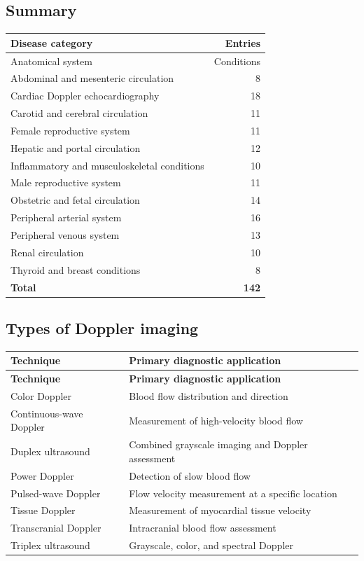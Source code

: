 \subsection{Summary}
\begin{center}
\begin{tabular}{@{}p{}r@{}}
\toprule
\textbf{Disease category} & \textbf{Entries} \\
\midrule
Anatomical system & Conditions \\
Abdominal and mesenteric circulation & 8 \\
Cardiac Doppler echocardiography & 18 \\
Carotid and cerebral circulation & 11 \\
Female reproductive system & 11 \\
Hepatic and portal circulation & 12 \\
Inflammatory and musculoskeletal conditions & 10 \\
Male reproductive system & 11 \\
Obstetric and fetal circulation & 14 \\
Peripheral arterial system & 16 \\
Peripheral venous system & 13 \\
Renal circulation & 10 \\
Thyroid and breast conditions & 8 \\
\midrule
\textbf{Total} & \textbf{142} \\
\bottomrule
\end{tabular}
\end{center}

\subsection{Types of Doppler imaging}
\begin{longtable}{@{}p{}p{}@{}}
\toprule
\textbf{Technique} & \textbf{Primary diagnostic application} \\
\midrule
\endfirsthead
\toprule
\textbf{Technique} & \textbf{Primary diagnostic application} \\
\midrule
\endhead
Color Doppler & Blood flow distribution and direction \\
Continuous-wave Doppler & Measurement of high-velocity blood flow \\
Duplex ultrasound & Combined grayscale imaging and Doppler assessment \\
Power Doppler & Detection of slow blood flow \\
Pulsed-wave Doppler & Flow velocity measurement at a specific location \\
Tissue Doppler & Measurement of myocardial tissue velocity \\
Transcranial Doppler & Intracranial blood flow assessment \\
Triplex ultrasound & Grayscale, color, and spectral Doppler \\
\bottomrule
\end{longtable}

